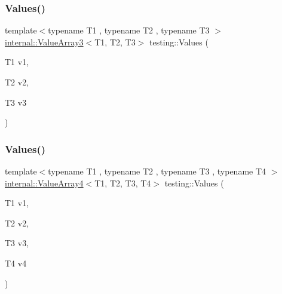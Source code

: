 \mbox{\label{namespacetesting_a344ca3522cb99a7b98801a9577993011}} 
\subsubsection{\texorpdfstring{Values()}{Values()}\hspace{0.1cm}{\footnotesize\ttfamily [4/51]}}
{\footnotesize\ttfamily template$<$typename T1 , typename T2 , typename T3 $>$ \\
\mbox{\hyperlink{classtesting_1_1internal_1_1_value_array3}{internal\+::\+Value\+Array3}}$<$T1, T2, T3$>$ testing\+::\+Values (\begin{DoxyParamCaption}\item[{T1}]{v1,  }\item[{T2}]{v2,  }\item[{T3}]{v3 }\end{DoxyParamCaption})}

\mbox{\label{namespacetesting_a4b14d4b6e471a1fb8ee3e5706dbc11c6}} 
\subsubsection{\texorpdfstring{Values()}{Values()}\hspace{0.1cm}{\footnotesize\ttfamily [5/51]}}
{\footnotesize\ttfamily template$<$typename T1 , typename T2 , typename T3 , typename T4 $>$ \\
\mbox{\hyperlink{classtesting_1_1internal_1_1_value_array4}{internal\+::\+Value\+Array4}}$<$T1, T2, T3, T4$>$ testing\+::\+Values (\begin{DoxyParamCaption}\item[{T1}]{v1,  }\item[{T2}]{v2,  }\item[{T3}]{v3,  }\item[{T4}]{v4 }\end{DoxyParamCaption})}

\mbox{\label{namespacetesting_aa2c5f97a44a14ae95da8313b115b6396}} 
